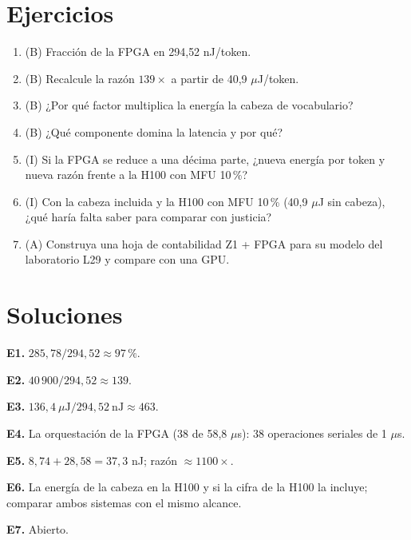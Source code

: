 \documentclass[11pt,a4paper]{article}
\begin{document}
\section{Ejercicios}
\begin{enumerate}[label=\textbf{E\arabic*.}]
\item (B) Fracción de la FPGA en 294{,}52 nJ/token.
\item (B) Recalcule la razón $139\times$ a partir de 40{,}9 $\mu$J/token.
\item (B) ¿Por qué factor multiplica la energía la cabeza de vocabulario?
\item (B) ¿Qué componente domina la latencia y por qué?
\item (I) Si la FPGA se reduce a una décima parte, ¿nueva energía por token y nueva razón frente a la H100 con MFU 10\,\%?
\item (I) Con la cabeza incluida y la H100 con MFU 10\,\% (40{,}9 $\mu$J sin cabeza), ¿qué haría falta saber para comparar con justicia?
\item (A) Construya una hoja de contabilidad Z1 + FPGA para su modelo del laboratorio L29 y compare con una GPU.
\end{enumerate}
\section{Soluciones}
\begin{solucion}
\textbf{E1.} $285{,}78/294{,}52\approx97\,\%$.

\textbf{E2.} $40\,900/294{,}52\approx139$.

\textbf{E3.} $136{,}4\ \mu\text{J}/294{,}52\ \text{nJ}\approx463$.

\textbf{E4.} La orquestación de la FPGA (38 de 58{,}8 $\mu$s): 38 operaciones seriales de 1 $\mu$s.

\textbf{E5.} $8{,}74+28{,}58=37{,}3$ nJ; razón $\approx1100\times$.

\textbf{E6.} La energía de la cabeza en la H100 y si la cifra de la H100 la incluye; comparar ambos sistemas con el mismo alcance.

\textbf{E7.} Abierto.
\end{solucion}
\end{document}
